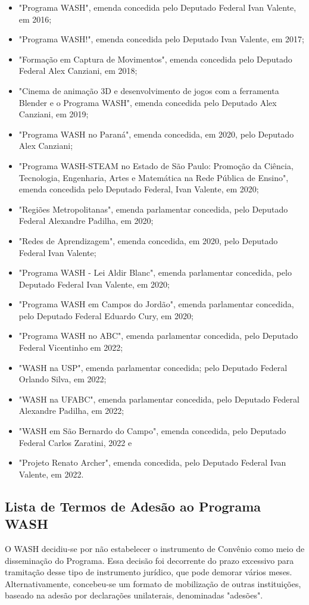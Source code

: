 \begin{itemize}
\item "Programa WASH", emenda concedida pelo Deputado Federal Ivan Valente, em 2016;
\item "Programa WASH!", emenda concedida pelo Deputado Ivan Valente, em 2017;
\item "Formação em Captura de Movimentos", emenda concedida pelo Deputado Federal Alex Canziani, em 2018;
\item "Cinema de animação 3D e desenvolvimento de jogos com a ferramenta Blender e o Programa WASH", emenda concedida pelo Deputado Alex Canziani, em 2019;
\item "Programa WASH no Paraná", emenda concedida, em 2020, pelo Deputado Alex Canziani;
\item "Programa WASH-STEAM no Estado de São Paulo: Promoção da Ciência, Tecnologia, Engenharia, Artes  e Matemática na Rede Pública de Ensino", emenda concedida pelo Deputado Federal, Ivan Valente, em 2020;
\item "Regiões Metropolitanas", emenda parlamentar concedida, pelo Deputado Federal Alexandre Padilha, em 2020;
\item "Redes de Aprendizagem", emenda concedida, em 2020, pelo Deputado Federal Ivan Valente;
\item "Programa WASH - Lei Aldir Blanc", emenda parlamentar concedida, pelo Deputado Federal  Ivan Valente, em 2020;
\item "Programa WASH em Campos do Jordão", emenda parlamentar concedida, pelo Deputado Federal Eduardo Cury, em 2020;
\item "Programa WASH no ABC", emenda parlamentar concedida, pelo Deputado Federal Vicentinho em 2022;
\item "WASH na USP", emenda parlamentar concedida; pelo Deputado Federal Orlando Silva, em 2022;
\item "WASH na UFABC", emenda parlamentar concedida, pelo Deputado Federal Alexandre Padilha, em 2022;
\item "WASH em São Bernardo do Campo", emenda concedida, pelo Deputado Federal Carlos Zaratini, 2022 e
\item "Projeto Renato Archer", emenda concedida, pelo Deputado Federal Ivan Valente, em 2022.
\end{itemize}

\subsection[Lista de Termos de Adesão ao Programa WASH]{Lista de Termos de Adesão ao Programa WASH}\label{Lista de Termos de Adesão ao Programa WASH}
O WASH decidiu-se por não estabelecer o instrumento de Convênio como meio de disseminação do Programa. Essa decisão foi decorrente do prazo excessivo para tramitação desse tipo de instrumento jurídico, que pode demorar vários meses. Alternativamente, concebeu-se um formato de mobilização de outras instituições, baseado na adesão por declarações  unilaterais, denominadas "adesões".


